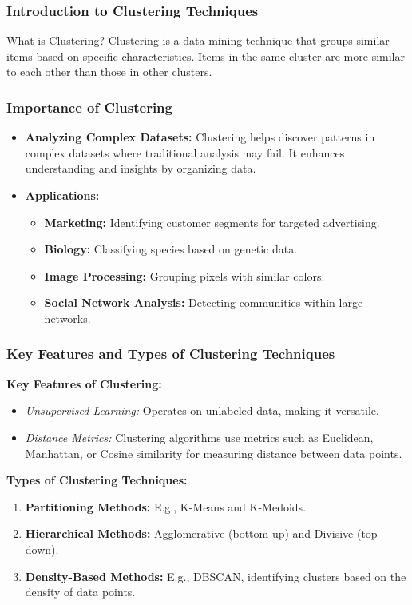 \documentclass[aspectratio=169]{beamer}
\begin{document}
\frame{\titlepage}

\begin{frame}[fragile]
    \frametitle{Introduction to Clustering Techniques}
    \begin{block}{What is Clustering?}
        Clustering is a data mining technique that groups similar items based on specific characteristics. 
        Items in the same cluster are more similar to each other than those in other clusters.
    \end{block}
\end{frame}

\begin{frame}[fragile]
    \frametitle{Importance of Clustering}
    \begin{itemize}
        \item \textbf{Analyzing Complex Datasets:} 
            Clustering helps discover patterns in complex datasets where traditional analysis may fail.
            It enhances understanding and insights by organizing data.
        \item \textbf{Applications:} 
            \begin{itemize}
                \item \textbf{Marketing:} Identifying customer segments for targeted advertising.
                \item \textbf{Biology:} Classifying species based on genetic data.
                \item \textbf{Image Processing:} Grouping pixels with similar colors.
                \item \textbf{Social Network Analysis:} Detecting communities within large networks.
            \end{itemize}
    \end{itemize}
\end{frame}

\begin{frame}[fragile]
    \frametitle{Key Features and Types of Clustering Techniques}
    \textbf{Key Features of Clustering:}
    \begin{itemize}
        \item \textit{Unsupervised Learning:} 
            Operates on unlabeled data, making it versatile.
        \item \textit{Distance Metrics:} 
            Clustering algorithms use metrics such as Euclidean, Manhattan, or Cosine similarity for measuring distance between data points.
    \end{itemize}

    \textbf{Types of Clustering Techniques:}
    \begin{enumerate}
        \item \textbf{Partitioning Methods:} 
            E.g., K-Means and K-Medoids.
        \item \textbf{Hierarchical Methods:} 
            Agglomerative (bottom-up) and Divisive (top-down).
        \item \textbf{Density-Based Methods:} 
            E.g., DBSCAN, identifying clusters based on the density of data points.
    \end{enumerate}
\end{frame}
\end{document}
